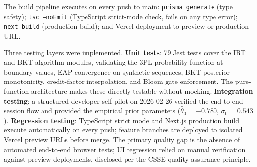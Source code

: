 The build pipeline executes on every push to main: \texttt{prisma generate}
(type safety); \texttt{tsc --noEmit} (TypeScript strict-mode check, fails
on any type error); \texttt{next build} (production build); and Vercel
deployment to preview or production URL.

Three testing layers were implemented. \textbf{Unit tests}: 79 Jest tests
cover the IRT and BKT algorithm modules, validating the 3PL probability
function at boundary values, EAP convergence on synthetic sequences, BKT
posterior monotonicity, credit-factor interpolation, and Bloom gate enforcement.
The pure-function architecture makes these directly testable without mocking.
\textbf{Integration testing}: a structured developer self-pilot on 2026-02-26
verified the end-to-end session flow and provided the empirical prior parameters
($\hat{\theta}_0 = -0.780$, $\sigma_0 = 0.543$). \textbf{Regression testing}:
TypeScript strict mode and Next.js production build execute automatically on
every push; feature branches are deployed to isolated Vercel preview URLs
before merge. The primary quality gap is the absence of automated end-to-end
browser tests; UI regression relied on manual verification against preview
deployments, disclosed per the CSSE quality assurance principle.
